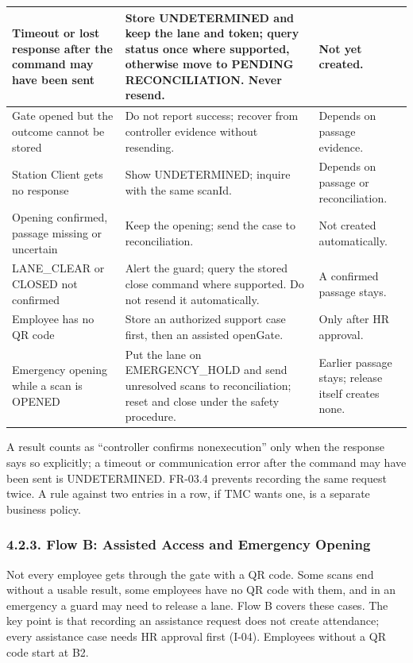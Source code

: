 \begin{longtable}{|>{\raggedright\arraybackslash}p{114.5pt}|>{\raggedright\arraybackslash}p{194.5pt}|>{\raggedright\arraybackslash}p{102.5pt}|}
\hline
Timeout or lost response after the command may have been sent & Store UNDETERMINED and keep the lane and token; query status once where supported, otherwise move to PENDING RECONCILIATION. Never resend. & Not yet created. \\
\hline
Gate opened but the outcome cannot be stored & Do not report success; recover from controller evidence without resending. & Depends on passage evidence. \\
\hline
Station Client gets no response & Show UNDETERMINED; inquire with the same scanId. & Depends on passage or reconciliation. \\
\hline
Opening confirmed, passage missing or uncertain & Keep the opening; send the case to reconciliation. & Not created automatically. \\
\hline
LANE\_CLEAR or CLOSED not confirmed & Alert the guard; query the stored close command where supported. Do not resend it automatically. & A confirmed passage stays. \\
\hline
Employee has no QR code & Store an authorized support case first, then an assisted openGate. & Only after HR approval. \\*
\hline\noalign{\nobreak}
Emergency opening while a scan is OPENED & Put the lane on EMERGENCY\_HOLD and send unresolved scans to reconciliation; reset and close under the safety procedure. & Earlier passage stays; release itself creates none. \\
\hline
\end{longtable}


A result counts as ``controller confirms nonexecution'' only when the response says so explicitly; a timeout or communication error after the command may have been sent is UNDETERMINED. FR-03.4 prevents recording the same request twice. A rule against two entries in a row, if TMC wants one, is a separate business policy.

\subsubsection*{4.2.3. Flow B: Assisted Access and Emergency Opening}

{}


Not every employee gets through the gate with a QR code. Some scans end without a usable result, some employees have no QR code with them, and in an emergency a guard may need to release a lane. Flow B covers these cases. The key point is that recording an assistance request does not create attendance; every assistance case needs HR approval first (I-04). Employees without a QR code start at B2.

